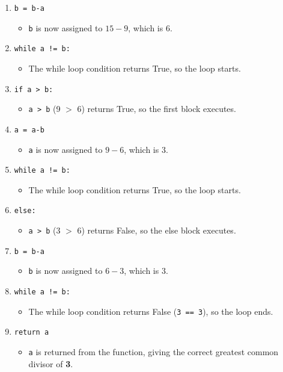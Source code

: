 \documentclass{article}
\theoremstyle{theorem}
\theoremstyle{definition}
\theoremstyle{remark}
\begin{document}
\begin{enumerate}[noitemsep]
\begin{itemize}
  \end{itemize}
  \item \texttt{b = b-a}
  \begin{itemize}
      \item \texttt{b} is now assigned to $15 - 9$, which is $6$.
  \end{itemize}
  \item \texttt{while a != b:}
  \begin{itemize}
      \item The while loop condition returns True, so the loop starts.
  \end{itemize}
  \item \texttt{if a > b:}
  \begin{itemize}
      \item \texttt{a > b} (9 $>$ 6) returns True, so the first block executes.
  \end{itemize}
  \item \texttt{a = a-b}
  \begin{itemize}
      \item \texttt{a} is now assigned to $9 - 6$, which is $3$.
  \end{itemize}
  \item \texttt{while a != b:}
  \begin{itemize}
      \item The while loop condition returns True, so the loop starts.
  \end{itemize}
  \item \texttt{else:}
  \begin{itemize}
      \item \texttt{a > b} (3 $>$ 6) returns False, so the else block executes.
  \end{itemize}
  \item \texttt{b = b-a}
  \begin{itemize}
      \item \texttt{b} is now assigned to $6 - 3$, which is $3$.
  \end{itemize}
  \item \texttt{while a != b:}
  \begin{itemize}
      \item The while loop condition returns False (\texttt{3 == 3}), so the loop ends.
  \end{itemize}
  \item \texttt{return a}
  \begin{itemize}
      \item \texttt{a} is returned from the function, giving the correct greatest common divisor of \textbf{3}.
  \end{itemize}
\end{enumerate}
\end{document}
